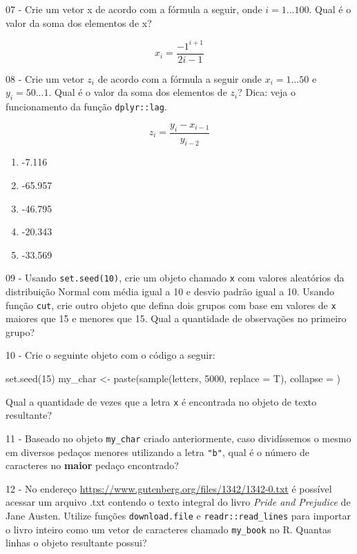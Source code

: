 \documentclass[
  11pt,
]{book}
\newenvironment{Shaded}{\begin{snugshade}}{\end{snugshade}}
\newcommand{\NormalTok}[1]{#1}
\providecommand{\tightlist}{%
  \setlength{\itemsep}{0pt}\setlength{\parskip}{0pt}}
\begin{document}
07 -
Crie um vetor x de acordo com a fórmula a seguir, onde \(i=1...100\). Qual é o valor da soma dos elementos de x?

\[
x_i=\frac{-1^{i+1}}{2i-1}
\]

08 -
Crie um vetor \(z_i\) de acordo com a fórmula a seguir onde \(x_i=1...50\) e \(y_i=50...1\). Qual é o valor da soma dos elementos de \(z_i\)? Dica: veja o funcionamento da função \texttt{dplyr::lag}.

\[
z_i=\frac{y_i - x_{i-1}}{y_{i-2}}
\]

\begin{enumerate}
\def\labelenumi{\alph{enumi})}
\tightlist
\item
  -7.116
\item
  -65.957
\item
  -46.795
\item
  -20.343
\item
  -33.569
\end{enumerate}

09 -
Usando \texttt{set.seed(10)}, crie um objeto chamado \texttt{x} com valores aleatórios da distribuição Normal com média igual a 10 e desvio padrão igual a 10. Usando função \texttt{cut}, crie outro objeto que defina dois grupos com base em valores de \texttt{x} maiores que 15 e menores que 15. Qual a quantidade de observações no primeiro grupo?

10 -
Crie o seguinte objeto com o código a seguir:

\begin{Shaded}
\begin{Highlighting}[]
\NormalTok{set.seed(15)}
\NormalTok{my\_char \textless{}{-} paste(sample(letters, 5000, replace = T), }
\NormalTok{                 collapse = \textquotesingle{}\textquotesingle{})}
\end{Highlighting}
\end{Shaded}

Qual a quantidade de vezes que a letra \texttt{\textquotesingle{}x\textquotesingle{}} é encontrada no objeto de texto resultante?

11 -
Baseado no objeto \texttt{my\_char} criado anteriormente, caso dividíssemos o mesmo em diversos pedaços menores utilizando a letra \texttt{"b"}, qual é o número de caracteres no \textbf{maior} pedaço encontrado?

12 -
No endereço \url{https://www.gutenberg.org/files/1342/1342-0.txt} é possível acessar um arquivo .txt contendo o texto integral do livro \emph{Pride and Prejudice} de Jane Austen. Utilize funções \texttt{download.file} e \texttt{readr::read\_lines} para importar o livro inteiro como um vetor de caracteres chamado \texttt{my\_book} no R. Quantas linhas o objeto resultante possui?
\end{document}
